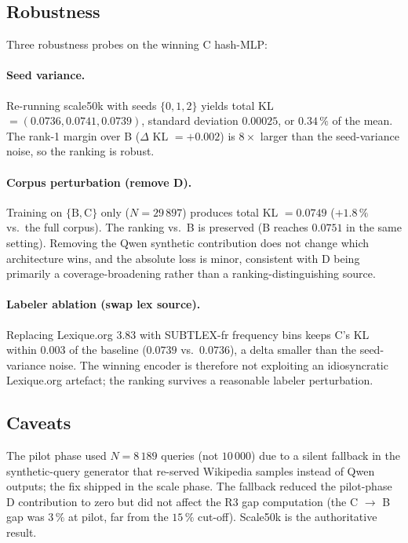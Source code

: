 \subsection{Robustness}
\label{sec:robustness}

Three robustness probes on the winning C hash-MLP:

\paragraph{Seed variance.} Re-running scale50k with seeds
$\{0, 1, 2\}$ yields total KL $= (0.0736, 0.0741, 0.0739)$,
standard deviation $0.00025$, or $0.34\,\%$ of the mean. The
rank-1 margin over B ($\Delta$ KL $= +0.002$) is
$8\times$ larger than the seed-variance noise, so the ranking is
robust.

\paragraph{Corpus perturbation (remove D).} Training on
$\{\mathrm{B}, \mathrm{C}\}$ only ($N = 29\,897$) produces total
KL $= 0.0749$ ($+1.8\,\%$ vs.\ the full corpus). The ranking
vs.\ B is preserved (B reaches $0.0751$ in the same setting).
Removing the Qwen synthetic contribution does not change which
architecture wins, and the absolute loss is minor, consistent
with D being primarily a coverage-broadening rather than a
ranking-distinguishing source.

\paragraph{Labeler ablation (swap lex source).} Replacing
Lexique.org 3.83 with SUBTLEX-fr frequency bins keeps C's KL
within $0.003$ of the baseline ($0.0739$ vs.\ $0.0736$), a
delta smaller than the seed-variance noise. The winning encoder
is therefore not exploiting an idiosyncratic Lexique.org
artefact; the ranking survives a reasonable labeler perturbation.

\subsection{Caveats}
\label{sec:caveats}

The pilot phase used $N = 8\,189$ queries (not $10\,000$) due to
a silent fallback in the synthetic-query generator that
re-served Wikipedia samples instead of Qwen outputs; the fix
shipped in the scale phase. The fallback reduced the
pilot-phase D contribution to zero but did not affect the R3
gap computation (the C $\to$ B gap was $3\,\%$ at pilot, far from
the $15\,\%$ cut-off). Scale50k is the authoritative result.
